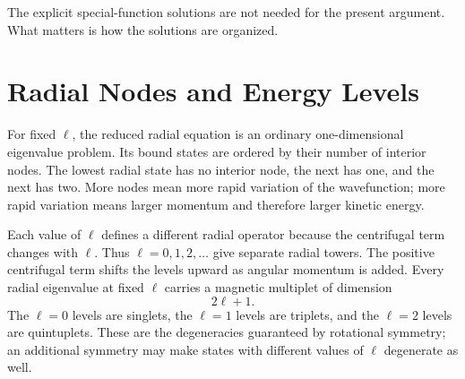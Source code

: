 \begin{classroomqa}
\end{classroomqa}

\begin{classroomqa}
\end{classroomqa}

The explicit special-function solutions are not needed for the present argument. What matters is how the solutions are organized.

\section{Radial Nodes and Energy Levels}

For fixed \(\ell\), the reduced radial equation is an ordinary one-dimensional eigenvalue problem. Its bound states are ordered by their number of interior nodes. The lowest radial state has no interior node, the next has one, and the next has two. More nodes mean more rapid variation of the wavefunction; more rapid variation means larger momentum and therefore larger kinetic energy.

Each value of \(\ell\) defines a different radial operator because the centrifugal term changes with \(\ell\). Thus \(\ell=0,1,2,\ldots\) give separate radial towers. The positive centrifugal term shifts the levels upward as angular momentum is added. Every radial eigenvalue at fixed \(\ell\) carries a magnetic multiplet of dimension
\begin{equation}
2\ell+1.
\end{equation}
The \(\ell=0\) levels are singlets, the \(\ell=1\) levels are triplets, and the \(\ell=2\) levels are quintuplets. These are the degeneracies guaranteed by rotational symmetry; an additional symmetry may make states with different values of \(\ell\) degenerate as well.

